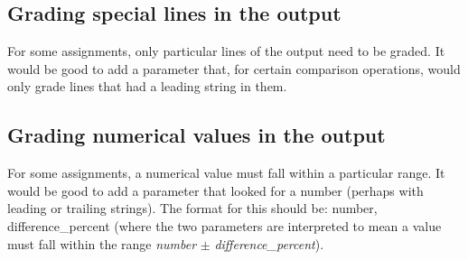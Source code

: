 \documentclass[12pt]{article}
\begin{document}
\subsection{Grading special lines in the output} \label{sec:speciallines}

For some assignments, only particular lines of the output need to be graded. It would be good to add a parameter that, for certain comparison operations, would only grade lines that had a leading string in them.

\subsection{Grading numerical values in the output} \label{sec:numericvalues}

For some assignments, a numerical value must fall within a particular range. It would be good to add a parameter that looked for a number (perhaps with leading or trailing strings). The format for this should be: number, difference\_percent (where the two parameters are interpreted to mean a value must fall within the range \textit{number} $\pm$ \textit{difference\_percent}).
\end{document}
